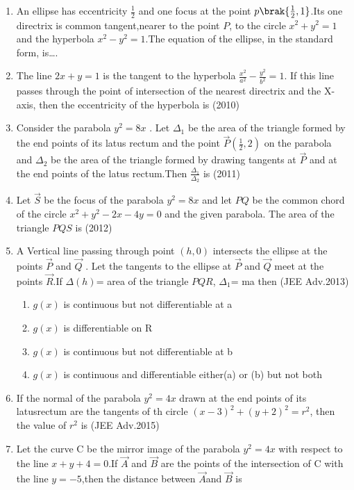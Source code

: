 \begin{enumerate}
    \item An ellipse has eccentricity $\frac{1}{2}$ and one focus at the point $p\brak{\frac{1}{2},1}$.Its one directrix is common tangent,nearer to the point $P$, to the circle $x^2+y^2=1$ and the hyperbola $x^2-y^2=1$.The equation of the ellipse, in the standard form, is\dots.
    \hfill{} 
\item The line $2x+y=1$ is the tangent to the hyperbola $\frac{x^2}{a^2}-\frac{y^2}{b^2}=1$. If this line passes through the point of intersection of the nearest directrix and the X-axis, then the eccentricity of the hyperbola is
\hfill(2010)
\item Consider the parabola $y^2=8x$ . Let $\Delta_1$ be the area of the triangle formed by the end points of its latus rectum and the point $\Vec{P}$$(\frac{1}{2},2)$ on the parabola and $\Delta_2$ be the area of the triangle formed by drawing tangents at $\Vec{P}$ and at the end points of the latus rectum.Then $\frac{\Delta_1}{\Delta_2}$ is 
\hfill(2011)
\item Let $\Vec{S}$ be the focus of the parabola $y^2=8x$ and let $PQ$ be the common chord of the circle $x^2+y^2-2x-4y=0$ and the given parabola. The area of the triangle $PQS$ is
\hfill(2012)
\item A Vertical line passing through point $(h,0)$ intersects the ellipse   at the points  $\Vec{P}$ and $\Vec{Q}$ . Let the tangents to the ellipse at $\Vec{P}$ and $\Vec{Q}$ meet at the points $\Vec{R}$.If $\Delta(h)$= area of the triangle $PQR$, $\Delta_1$= ma
then 
\hfill(JEE Adv.2013)
\begin{enumerate}
    \item $g(x)$ is continuous but not differentiable at a
    \item $g(x)$ is differentiable on R
    \item $g(x)$ is continuous but not differentiable at b
    \item $g(x)$ is continuous and differentiable either(a) or (b) but not both 
    \end{enumerate}
\item If the normal of the parabola $y^2=4x$ drawn at the end points of its latusrectum are the tangents of th circle $(x-3)^2+(y+2)^2=r^2$, then the value of $r^2$ is
\hfill(JEE Adv.2015)
\item Let the curve C be the mirror image of the parabola $y^2=4x$ with respect to the line $x+y+4=0$.If $\Vec{A}$ and $\Vec{B}$ are the points of the intersection of C with the line $y=-5$,then the distance between $\Vec{A}$and $\Vec{B}$ is
$$
\end{enumerate}
